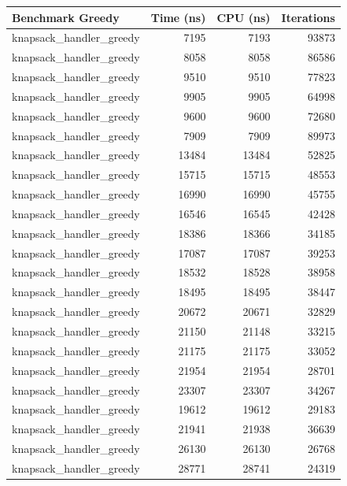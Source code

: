 \documentclass{llncs}
\begin{document}
\begin{table}[ht]
    \centering
    \begin{tabular}{@{}lrrr@{}}
        \toprule
        \textbf{Benchmark Greedy} & \textbf{Time (ns)} & \textbf{CPU (ns)} & \textbf{Iterations} \\
        \midrule
        knapsack\_handler\_greedy & 7195 & 7193 & 93873 \\
        knapsack\_handler\_greedy & 8058 & 8058 & 86586 \\
        knapsack\_handler\_greedy & 9510 & 9510 & 77823 \\
        knapsack\_handler\_greedy & 9905 & 9905 & 64998 \\
        knapsack\_handler\_greedy & 9600 & 9600 & 72680 \\
        knapsack\_handler\_greedy & 7909 & 7909 & 89973 \\
        knapsack\_handler\_greedy & 13484 & 13484 & 52825 \\
        knapsack\_handler\_greedy & 15715 & 15715 & 48553 \\
        knapsack\_handler\_greedy & 16990 & 16990 & 45755 \\
        knapsack\_handler\_greedy & 16546 & 16545 & 42428 \\
        knapsack\_handler\_greedy & 18386 & 18366 & 34185 \\
        knapsack\_handler\_greedy & 17087 & 17087 & 39253 \\
        knapsack\_handler\_greedy & 18532 & 18528 & 38958 \\
        knapsack\_handler\_greedy & 18495 & 18495 & 38447 \\
        knapsack\_handler\_greedy & 20672 & 20671 & 32829 \\
        knapsack\_handler\_greedy & 21150 & 21148 & 33215 \\
        knapsack\_handler\_greedy & 21175 & 21175 & 33052 \\
        knapsack\_handler\_greedy & 21954 & 21954 & 28701 \\
        knapsack\_handler\_greedy & 23307 & 23307 & 34267 \\
        knapsack\_handler\_greedy & 19612 & 19612 & 29183 \\
        knapsack\_handler\_greedy & 21941 & 21938 & 36639 \\
        knapsack\_handler\_greedy & 26130 & 26130 & 26768 \\
        knapsack\_handler\_greedy & 28771 & 28741 & 24319 \\

\end{tabular}
\end{table}
\end{document}
